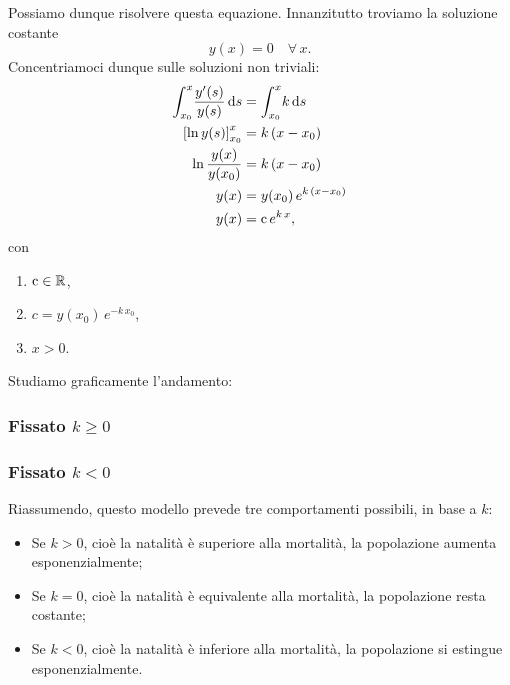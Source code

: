 \documentclass[../../analisi2]{subfiles}
\begin{document}
            Possiamo dunque risolvere questa equazione. Innanzitutto troviamo la soluzione costante
            \[
                y(x) = 0 \quad \forall \, x.
            \]
            Concentriamoci dunque sulle soluzioni non triviali:
            \begin{align*}
                \int_{x_0}^{x} \! \frac{y'(s)}{y(s)} \, \mathrm{d}s &= \int_{x_0}^{x} \! k \, \mathrm{d}s\\
                \left[\ln{y(s)}\right]_{x_0}^x &= k \, (x - x_0)\\
                \ln{\frac{y(x)}{y(x_0)}} &= k \, (x - x_0)\\
                y(x) &= y(x_0) \, e^{k \, (x - x_0)}\\
                y(x) &= \mathrm{c} \, e^{k \, x},
            \end{align*}
            \newpage
            con
            \begin{enumerate}
                \item \(\mathrm{c} \in \mathbb{R}\),
                \item \(c = y(x_0) \, e^{-k \, x_0}\),
                \item \(x > 0\).
            \end{enumerate}

            Studiamo graficamente l'andamento:

            \medskip

            \begin{minipage}[t]{.45\textwidth}
                \subsubsection*{Fissato \(k \geqslant 0\)}

                    

            \end{minipage}
            \hfill
            \begin{minipage}[t]{.45\textwidth}
                \subsubsection*{Fissato \(k < 0\)}

                    

            \end{minipage}

            \medskip

            Riassumendo, questo modello prevede tre comportamenti possibili, in base a \(k\):
            \begin{itemize}
                \item Se \(k > 0\), cioè la natalità è superiore alla mortalità, la popolazione aumenta esponenzialmente;
                \item Se \(k = 0\), cioè la natalità è equivalente alla mortalità, la popolazione resta costante;
                \item Se \(k < 0\), cioè la natalità è inferiore alla mortalità, la popolazione si estingue esponenzialmente.
            \end{itemize}
\end{document}
